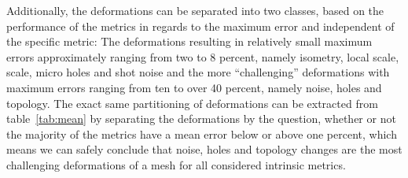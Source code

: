 Additionally, the deformations can be separated into two classes, based on the performance of the metrics in regards to the  maximum error and independent of the specific metric:
The deformations resulting in relatively small maximum errors approximately ranging from two to 8 percent, namely isometry, local scale, scale, micro holes and shot noise and the more ``challenging'' deformations with maximum errors ranging from ten to over 40 percent, namely noise, holes and topology.
The exact same partitioning of deformations can be extracted from table~\ref{tab:mean} by separating the deformations by the question, whether or not the majority of the metrics have a mean error below or above one percent, which means we can safely conclude that noise, holes and topology changes are the most challenging deformations of a mesh for all considered intrinsic metrics.
